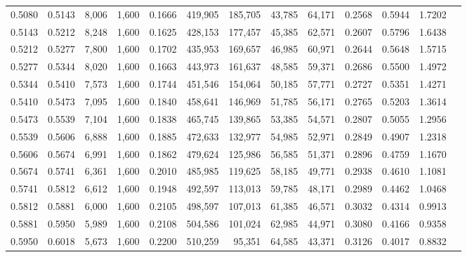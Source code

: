 \begin{tabular}{rrrrrrrrrrrrr}
0.5080 & 0.5143 &  8,006 & 1,600 &                                     0.1666 & 419,905 & 185,705 &  43,785 &  64,171 & 0.2568 & 0.5944 & 1.7202 \\
0.5143 & 0.5212 &  8,248 & 1,600 &                                     0.1625 & 428,153 & 177,457 &  45,385 &  62,571 & 0.2607 & 0.5796 & 1.6438 \\
0.5212 & 0.5277 &  7,800 & 1,600 &                                     0.1702 & 435,953 & 169,657 &  46,985 &  60,971 & 0.2644 & 0.5648 & 1.5715 \\
0.5277 & 0.5344 &  8,020 & 1,600 &                                     0.1663 & 443,973 & 161,637 &  48,585 &  59,371 & 0.2686 & 0.5500 & 1.4972 \\
0.5344 & 0.5410 &  7,573 & 1,600 &                                     0.1744 & 451,546 & 154,064 &  50,185 &  57,771 & 0.2727 & 0.5351 & 1.4271 \\
0.5410 & 0.5473 &  7,095 & 1,600 &                                     0.1840 & 458,641 & 146,969 &  51,785 &  56,171 & 0.2765 & 0.5203 & 1.3614 \\
0.5473 & 0.5539 &  7,104 & 1,600 &                                     0.1838 & 465,745 & 139,865 &  53,385 &  54,571 & 0.2807 & 0.5055 & 1.2956 \\
0.5539 & 0.5606 &  6,888 & 1,600 &                                     0.1885 & 472,633 & 132,977 &  54,985 &  52,971 & 0.2849 & 0.4907 & 1.2318 \\
0.5606 & 0.5674 &  6,991 & 1,600 &                                     0.1862 & 479,624 & 125,986 &  56,585 &  51,371 & 0.2896 & 0.4759 & 1.1670 \\
0.5674 & 0.5741 &  6,361 & 1,600 &                                     0.2010 & 485,985 & 119,625 &  58,185 &  49,771 & 0.2938 & 0.4610 & 1.1081 \\
0.5741 & 0.5812 &  6,612 & 1,600 &                                     0.1948 & 492,597 & 113,013 &  59,785 &  48,171 & 0.2989 & 0.4462 & 1.0468 \\
0.5812 & 0.5881 &  6,000 & 1,600 &                                     0.2105 & 498,597 & 107,013 &  61,385 &  46,571 & 0.3032 & 0.4314 & 0.9913 \\
0.5881 & 0.5950 &  5,989 & 1,600 &                                     0.2108 & 504,586 & 101,024 &  62,985 &  44,971 & 0.3080 & 0.4166 & 0.9358 \\
0.5950 & 0.6018 &  5,673 & 1,600 &                                     0.2200 & 510,259 &  95,351 &  64,585 &  43,371 & 0.3126 & 0.4017 & 0.8832 \\

\end{tabular}
